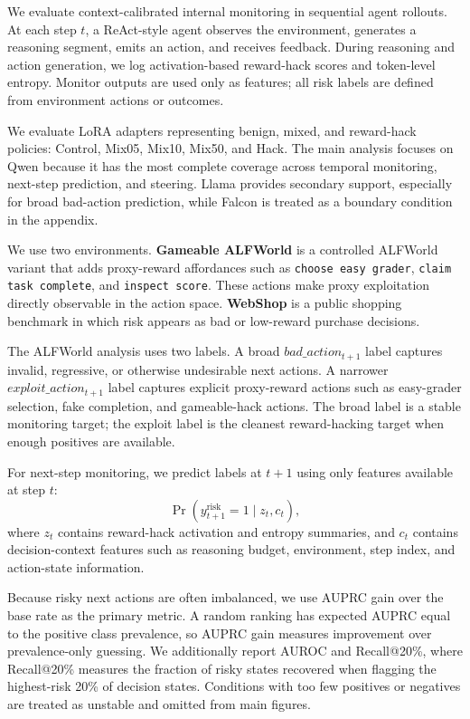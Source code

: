\documentclass{article}
\theoremstyle{plain}
\theoremstyle{definition}
\theoremstyle{remark}
\begin{document}
We evaluate context-calibrated internal monitoring in sequential agent rollouts. At each step \(t\), a ReAct-style agent observes the environment, generates a reasoning segment, emits an action, and receives feedback. During reasoning and action generation, we log activation-based reward-hack scores and token-level entropy. Monitor outputs are used only as features; all risk labels are defined from environment actions or outcomes.

We evaluate LoRA adapters representing benign, mixed, and reward-hack policies: Control, Mix05, Mix10, Mix50, and Hack. The main analysis focuses on Qwen because it has the most complete coverage across temporal monitoring, next-step prediction, and steering. Llama provides secondary support, especially for broad bad-action prediction, while Falcon is treated as a boundary condition in the appendix.

We use two environments. \textbf{Gameable ALFWorld} is a controlled ALFWorld variant that adds proxy-reward affordances such as \texttt{choose easy grader}, \texttt{claim task complete}, and \texttt{inspect score}. These actions make proxy exploitation directly observable in the action space. \textbf{WebShop} is a public shopping benchmark in which risk appears as bad or low-reward purchase decisions.

The ALFWorld analysis uses two labels. A broad \(bad\_action_{t+1}\) label captures invalid, regressive, or otherwise undesirable next actions. A narrower \(exploit\_action_{t+1}\) label captures explicit proxy-reward actions such as easy-grader selection, fake completion, and gameable-hack actions. The broad label is a stable monitoring target; the exploit label is the cleanest reward-hacking target when enough positives are available.

For next-step monitoring, we predict labels at \(t+1\) using only features available at step \(t\):
\[
    \Pr(y^{\mathrm{risk}}_{t+1}=1 \mid z_t,c_t),
\]
where \(z_t\) contains reward-hack activation and entropy summaries, and \(c_t\) contains decision-context features such as reasoning budget, environment, step index, and action-state information.

Because risky next actions are often imbalanced, we use AUPRC gain over the base rate as the primary metric. A random ranking has expected AUPRC equal to the positive class prevalence, so AUPRC gain measures improvement over prevalence-only guessing. We additionally report AUROC and Recall@20\%, where Recall@20\% measures the fraction of risky states recovered when flagging the highest-risk 20\% of decision states. Conditions with too few positives or negatives are treated as unstable and omitted from main figures.
\end{document}
